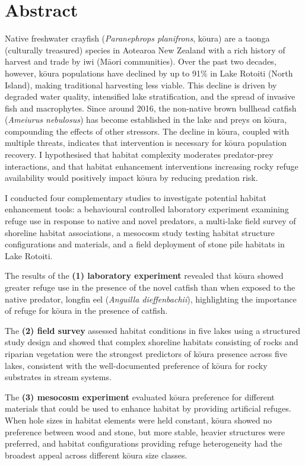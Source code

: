 \documentclass[
  12pt,
  a4paper,
  oneside]{scrbook}
\begin{document}
\chapter*{Abstract}\label{abstract}

Native freshwater crayfish (\emph{Paranephrops planifrons}, kōura) are a
taonga (culturally treasured) species in Aotearoa New Zealand with a
rich history of harvest and trade by iwi (Māori communities). Over the
past two decades, however, kōura populations have declined by up to 91\%
in Lake Rotoiti (North Island), making traditional harvesting less
viable. This decline is driven by degraded water quality, intensified
lake stratification, and the spread of invasive fish and macrophytes.
Since around 2016, the non-native brown bullhead catfish (\emph{Ameiurus
nebulosus}) has become established in the lake and preys on kōura,
compounding the effects of other stressors. The decline in kōura,
coupled with multiple threats, indicates that intervention is necessary
for kōura population recovery. I hypothesised that habitat complexity
moderates predator-prey interactions, and that habitat enhancement
interventions increasing rocky refuge availability would positively
impact kōura by reducing predation risk.

I conducted four complementary studies to investigate potential habitat
enhancement tools: a behavioural controlled laboratory experiment
examining refuge use in response to native and novel predators, a
multi-lake field survey of shoreline habitat associations, a mesocosm
study testing habitat structure configurations and materials, and a
field deployment of stone pile habitats in Lake Rotoiti.

The results of the \textbf{(1) laboratory experiment} revealed that
kōura showed greater refuge use in the presence of the novel catfish
than when exposed to the native predator, longfin eel (\emph{Anguilla
dieffenbachii}), highlighting the importance of refuge for kōura in the
presence of catfish.

The \textbf{(2) field survey} assessed habitat conditions in five lakes
using a structured study design and showed that complex shoreline
habitats consisting of rocks and riparian vegetation were the strongest
predictors of kōura presence across five lakes, consistent with the
well-documented preference of kōura for rocky substrates in stream
systems.

The \textbf{(3) mesocosm experiment} evaluated kōura preference for
different materials that could be used to enhance habitat by providing
artificial refuges. When hole sizes in habitat elements were held
constant, kōura showed no preference between wood and stone, but more
stable, heavier structures were preferred, and habitat configurations
providing refuge heterogeneity had the broadest appeal across different
kōura size classes.
\end{document}
